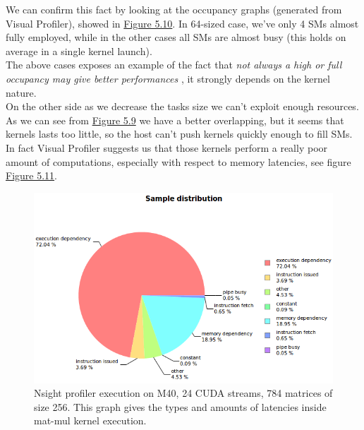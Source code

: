 We can confirm this fact by looking at the occupancy graphs (generated from Visual Profiler), showed in \hyperref[fig:SMuse]{Figure 5.10}. In 64-sized case, we've only 4 SMs almost fully employed, while in the other cases all SMs are almost busy (this holds on average in a single kernel launch).\\
The above cases exposes an example of the fact that \textit{not always a high or full occupancy may give better performances} \cite{loweroccupancy,cudabestpractices}, it strongly depends on the kernel nature.\\
On the other side as we decrease the tasks size we can't exploit enough resources. As we can see from \hyperref[fig:timeln64]{Figure 5.9} we have a better overlapping, but it seems that kernels lasts too little, so the host can't push kernels quickly enough to fill SMs. In fact Visual Profiler suggests us that those kernels perform a really poor amount of computations, especially with respect to memory latencies, see figure \hyperref[fig:mat62latency]{Figure 5.11}.\\ 
\begin{figure}[!tb]
	\vspace{-1cm}
	\hspace{-1cm}
	\includegraphics[scale=0.8]{plots/matmul784_64_kerlatencies.png}
	\caption{Nsight profiler execution on M40, 24 CUDA streams, 784 matrices of size 256. This graph gives the types and amounts of latencies inside mat-mul kernel execution.}
	\label{fig:mat62latency}
\end{figure}

